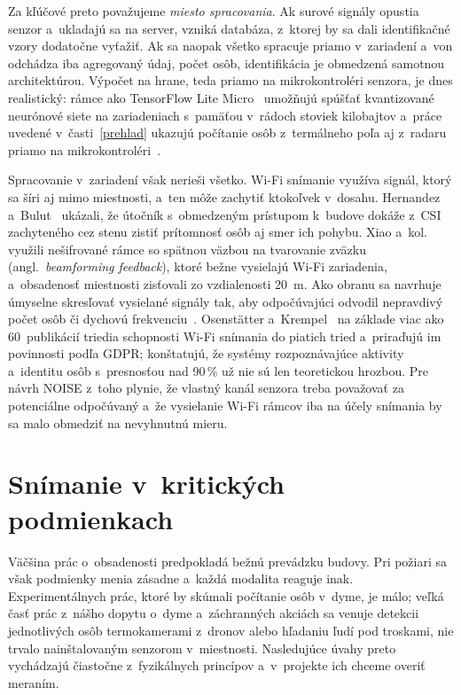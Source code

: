 \documentclass[10pt,twoside,a4paper]{article}
\begin{document}
Za kľúčové preto považujeme \emph{miesto spracovania}. Ak surové signály opustia senzor a~ukladajú sa na server, vzniká databáza, z~ktorej by sa dali identifikačné vzory dodatočne vyťažiť. Ak sa naopak všetko spracuje priamo v~zariadení a~von odchádza iba agregovaný údaj, počet osôb, identifikácia je obmedzená samotnou architektúrou. Výpočet na hrane, teda priamo na mikrokontroléri senzora, je dnes realistický: rámce ako TensorFlow Lite Micro~\cite{david2021tflm} umožňujú spúšťať kvantizované neurónové siete na zariadeniach s~pamäťou v~rádoch stoviek kilobajtov a~práce uvedené v~časti~\ref{prehlad} ukazujú počítanie osôb z~termálneho poľa aj z~radaru priamo na mikrokontroléri~\cite{papanashi2026thermal,risso2024hwsw,mach2024uwb}.

Spracovanie v~zariadení však nerieši všetko. Wi-Fi snímanie využíva signál, ktorý sa šíri aj mimo miestnosti, a~ten môže zachytiť ktokoľvek v~dosahu. Hernandez a~Bulut~\cite{hernandez2021adversarial} ukázali, že útočník s~obmedzeným prístupom k~budove dokáže z~CSI zachyteného cez stenu zistiť prítomnosť osôb aj smer ich pohybu. Xiao a~kol.~\cite{xiao2025leakybeam} využili nešifrované rámce so spätnou väzbou na tvarovanie zväzku (angl.~\emph{beamforming feedback}), ktoré bežne vysielajú Wi-Fi zariadenia, a~obsadenosť miestnosti zisťovali zo vzdialenosti 20~m. Ako obranu sa navrhuje úmyselne skresľovať vysielané signály tak, aby odpočúvajúci odvodil nepravdivý počet osôb či dychovú frekvenciu~\cite{he2024deception}. Osenstätter a~Krempel~\cite{osenstatter2026astiv} na základe viac ako 60~publikácií triedia schopnosti Wi-Fi snímania do piatich tried a~priraďujú im povinnosti podľa GDPR; konštatujú, že systémy rozpoznávajúce aktivity a~identitu osôb s~presnosťou nad 90\,\% už nie sú len teoretickou hrozbou. Pre návrh NOISE z~toho plynie, že vlastný kanál senzora treba považovať za potenciálne odpočúvaný a~že vysielanie Wi-Fi rámcov iba na účely snímania by sa malo obmedziť na nevyhnutnú mieru.

\section{Snímanie v~kritických podmienkach}\label{kriticke}

Väčšina prác o~obsadenosti predpokladá bežnú prevádzku budovy. Pri požiari sa však podmienky menia zásadne a~každá modalita reaguje inak. Experimentálnych prác, ktoré by skúmali počítanie osôb v~dyme, je málo; veľká časť prác z~nášho dopytu o~dyme a~záchranných akciách sa venuje detekcii jednotlivých osôb termokamerami z~dronov alebo hľadaniu ľudí pod troskami, nie trvalo nainštalovaným senzorom v~miestnosti. Nasledujúce úvahy preto vychádzajú čiastočne z~fyzikálnych princípov a~v~projekte ich chceme overiť meraním.
\end{document}
